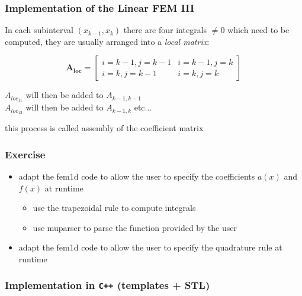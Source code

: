 \documentclass[smaller,a4paper]{beamer}
\newcommand{\Myfoilheadskip}[1]{\begin{frame}\frametitle{#1}}
\newcommand{\mtrx}[1]{\mathbf{#1}}
\begin{document}
\Myfoilheadskip{Implementation of the Linear FEM III}%

In each subinterval $(x_{k-1},x_{k})$ there are four integrals $\neq 0$ which 
need to be computed, they are usually arranged into a \emph{local matrix}:

$$
\mtrx{A_{loc}}=
\left[\begin{array}{cc}
i=k-1,j=k-1 & i=k-1,j=k \\[.1cm]
i=k,j=k-1 & i=k,j=k 
\end{array}\right]
$$

\null

\noindent 
$A_{loc_{11}}$ will then be added to $A_{k-1,k-1}$  \\
$A_{loc_{12}}$ will then be added to $A_{k-1,k}$ etc...

\null

this process is called assembly of the coefficient matrix

\end{frame}

\begin{frame}\frametitle{Exercise}
\begin{itemize}
\item adapt the fem1d code to allow the user to specify the coefficients $a(x)$ and $f(x)$ at runtime
\begin{itemize}
\item use the trapezoidal rule to compute integrals
\item use muparser to parse the function provided by the user
\end{itemize}
\item adapt the fem1d code to allow the user to specify the quadrature rule at runtime
\end{itemize}
\end{frame}

\begin{frame}[fragile]
\frametitle{Implementation in {\tt C++} (templates + STL)}
\tiny
{}
\end{frame}
\end{document}
